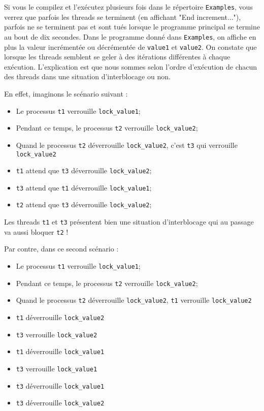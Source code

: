 \documentclass[fleqn,11pt]{article}
\begin{document}
Si vous le compilez et l'exécutez plusieurs fois dans le répertoire \texttt{Examples}, vous verrez que
parfois les threads se terminent (en affichant "End increment..."), parfois ne se terminent pas et
sont tués lorsque le programme principal se termine au bout de dix secondes. Dans le programme donné
dans \texttt{Examples}, on affiche en plus la valeur incrémentée ou décrémentée de \texttt{value1}
et \texttt{value2}. On constate que lorsque les threads semblent se geler à des itérations différentes
à chaque exécution.
L'explication est que nous sommes selon l'ordre d'exécution de chacun des threads dans une situation d'interblocage ou non. 

En effet, imaginons le scénario suivant :
\begin{itemize}
  \item Le processus \texttt{t1} verrouille \texttt{lock\_value1};
  \item Pendant ce temps, le processus \texttt{t2} verrouille \texttt{lock\_value2};
  \item Quand le processus \texttt{t2} déverrouille \texttt{lock\_value2}, c'est \texttt{t3} qui
        verrouille \texttt{lock\_value2}
  \item \texttt{t1} attend que \texttt{t3} déverrouille \texttt{lock\_value2};
  \item \texttt{t3} attend que \texttt{t1} déverrouille \texttt{lock\_value1};
  \item \texttt{t2} attend que \texttt{t3} déverrouille \texttt{lock\_value2};
\end{itemize}

Les threads \texttt{t1} et \texttt{t3} présentent bien une situation d'interblocage qui au passage
va aussi bloquer \texttt{t2} ! 

Par contre, dans ce second scénario :
\begin{itemize}
  \item Le processus \texttt{t1} verrouille \texttt{lock\_value1};
  \item Pendant ce temps, le processus \texttt{t2} verrouille \texttt{lock\_value2};
  \item Quand le processus \texttt{t2} déverrouille \texttt{lock\_value2}, \texttt{t1}
        verrouille \texttt{lock\_value2}
  \item \texttt{t1} déverrouille \texttt{lock\_value2}
  \item \texttt{t3} verrouille \texttt{lock\_value2}
  \item \texttt{t1} déverrouille \texttt{lock\_value1}
  \item \texttt{t3} verrouille \texttt{lock\_value1}
  \item \texttt{t3} déverrouille \texttt{lock\_value1}
  \item \texttt{t3} déverrouille \texttt{lock\_value2}
\end{itemize}
\end{document}
